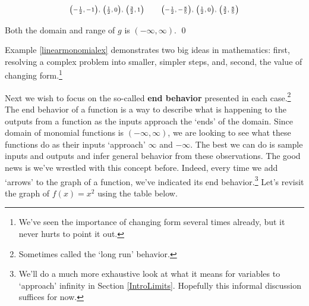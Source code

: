\documentclass{ximera}
\begin{document}
\begin{example}
\begin{enumerate}
\[\begin{array}{rcl}
 \text{\scriptsize  $\left(-\frac{1}{2},-1 \right)$, $\left(\frac{1}{2},0 \right)$, $\left(\frac{3}{2},1 \right)$} & & \text{\scriptsize  $\left(-\frac{1}{2},-\frac{8}{5} \right)$, $\left(\frac{1}{2},0 \right)$, $\left(\frac{3}{2},\frac{8}{5} \right)$} \\
 
 \end{array} \]
 
 Both the domain and range of $g$ is $(-\infty, \infty)$. \qed
 
 \end{enumerate} 

 
\end{example}


Example \ref{linearmonomialex} demonstrates two big ideas in mathematics:  first, resolving a complex problem into smaller, simpler steps, and, second, the value of changing form.\footnote{We've seen the importance of changing form several times already, but it never hurts to point it out.}

Next  we wish  to focus on the so-called  \textbf{end behavior} presented in each case.\footnote{Sometimes called the `long run' behavior.}  The end behavior of a function is a way to describe what is happening to the outputs from a function as the inputs approach the `ends' of the domain. Since domain of monomial functions is $(-\infty, \infty)$, we are looking to see what these functions do as their inputs `approach'  $\infty$ and $-\infty$.  The best we can do is sample inputs and outputs and infer general behavior from these observations.  The good news is we've wrestled with this concept before. Indeed, every time we add `arrows' to the graph of a function, we've indicated its end behavior.\footnote{We'll do a much more exhaustive look at what it means for variables to `approach' infinity in Section \ref{IntroLimits}.  Hopefully this informal discussion suffices for now.} Let's revisit  the graph of $f(x) = x^2$ using the table below.


 \medskip
 
\end{document}
